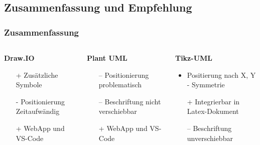 \documentclass[xcolor=dvipsnames]{beamer}
\begin{document}
\begin{frame}
	\section{Zusammenfassung und Empfehlung}
	\frametitle{Zusammenfassung}
	\begin{columns}
	
			
			\begin{column}{0.33\textwidth}
				\begin{block}{\textbf{Draw.IO}}
					\begin{itemize}
						\item [+] Zusätzliche Symbole
						\item [-] Positionierung Zeitaufwändig
						\item[+] WebApp und VS-Code
					\end{itemize}
				\end{block}
			\end{column}

		\begin{column}{0.4\textwidth}
			\begin{block}{\textbf{Plant UML}}
				\begin{itemize}
					\item[--] Positionierung problematisch
					\item[--] Beschriftung nicht verschiebbar
					\item[+] WebApp und VS-Code
				\end{itemize}
			\end{block}
		\end{column}
		
		\begin{column}{0.33\textwidth}
			\begin{block}{\textbf{Tikz-UML}}
				\begin{itemize}
					\item Positierung nach X, Y - Symmetrie
					\item[+] Integrierbar in Latex-Dokument 
					\item[--] Beschriftung unverschiebbar
				\end{itemize}
			\end{block}
		\end{column}
		

\end{columns}
\end{frame}
\end{document}
